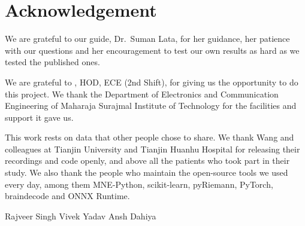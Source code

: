 \chapter*{Acknowledgement}
We are grateful to our guide, Dr.\ Suman Lata, for her guidance, her patience with our
questions and her encouragement to test our own results as hard as we tested the
published ones.

We are grateful to \HODName{}, HOD, ECE (2nd Shift), for giving us the opportunity to do
this project.
We thank the Department of Electronics and Communication Engineering of Maharaja Surajmal
Institute of Technology for the facilities and support it gave us.

This work rests on data that other people chose to share. We thank Wang and colleagues at
Tianjin University and Tianjin Huanhu Hospital for releasing their recordings and code
openly, and above all the patients who took part in their study. We also thank the people
who maintain the open-source tools we used every day, among them MNE-Python, scikit-learn,
pyRiemann, PyTorch, braindecode and ONNX Runtime.

\vspace{1.5cm}
\noindent Rajveer Singh \hfill Vivek Yadav \hfill Ansh Dahiya
